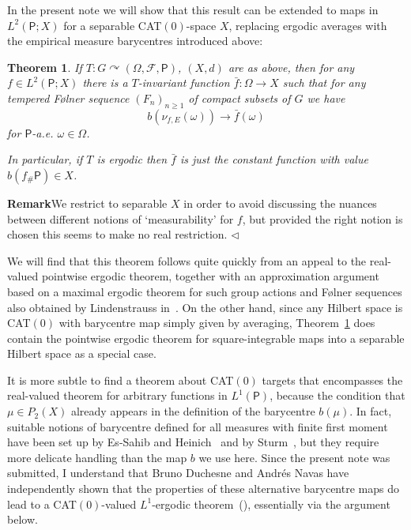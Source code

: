 \documentclass{amsart}
\newtheorem{thm}{Theorem}[section]
\theoremstyle{remark}
\newcommand{\sfP}{\mathsf{P}}
\newcommand{\F}{\mathcal{F}}
\renewcommand{\O}{\Omega}
\newcommand{\w}{\omega}
\newcommand{\fin}{\nolinebreak\hspace{\stretch{1}}$\lhd$}
\begin{document}
In the present note we will show that this result can be extended to
maps in $L^2(\sfP;X)$ for a separable CAT$(0)$-space $X$, replacing
ergodic averages with the empirical measure barycentres introduced
above:

\begin{thm}\label{thm:main}
If $T:G \curvearrowright (\O,\F,\sfP)$, $(X,d)$ are as above, then
for any $f \in L^2(\sfP;X)$ there is a $T$-invariant function
$\bar{f}:\O\to X$ such that for any tempered F\o lner sequence
$(F_n)_{n\geq 1}$ of compact subsets of $G$ we have
\[b(\nu_{f,E}(\w))\to \bar{f}(\w)\]
for $\sfP$-a.e. $\w \in \O$.

In particular, if $T$ is ergodic then $\bar{f}$ is just the constant
function with value $b(f_\#\sfP) \in X$.
\end{thm}

\textbf{Remark}\quad We restrict to separable $X$ in order to avoid
discussing the nuances between different notions of `measurability'
for $f$, but provided the right notion is chosen this seems to make
no real restriction. \fin

We will find that this theorem follows quite quickly from an appeal
to the real-valued pointwise ergodic theorem, together with an
approximation argument based on a maximal ergodic theorem for such
group actions and F\o lner sequences also obtained by Lindenstrauss
in~\cite{Lin01}.  On the other hand, since any Hilbert space is
CAT$(0)$ with barycentre map simply given by averaging,
Theorem~\ref{thm:main} does contain the pointwise ergodic theorem
for square-integrable maps into a separable Hilbert space as a
special case.

It is more subtle to find a theorem about CAT$(0)$ targets that encompasses the real-valued theorem for arbitrary functions in $L^1(\sfP)$, because the condition that $\mu
\in P_2(X)$ already appears in the definition of the barycentre
$b(\mu)$.  In fact, suitable notions of barycentre defined for all measures with finite first moment have been set up by Es-Sahib and Heinich~\cite{EsSHei99} and by Sturm~\cite{Stu03}, but they require more delicate handling than the map $b$ we use here. Since the present note was submitted, I understand that Bruno Duchesne and Andr\'es Navas have independently shown that the properties of these alternative barycentre maps do lead to a CAT$(0)$-valued $L^1$-ergodic theorem~(\cite{Dus10,Nav11}), essentially via the argument below.
\end{document}
